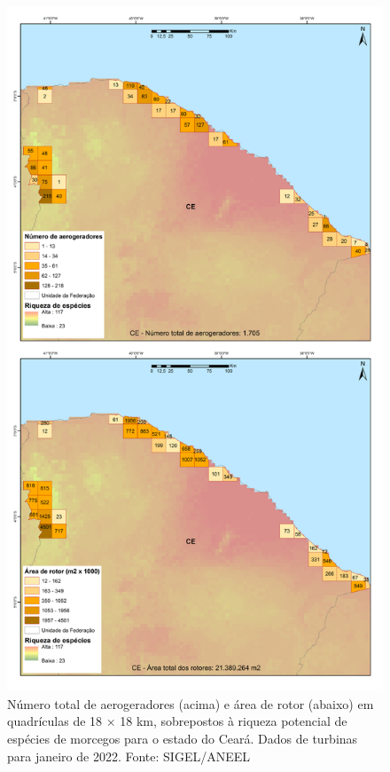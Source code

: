 \documentclass[
  oneside]{scrbook}
\begin{document}
\begin{figure}[H]

{\centering \includegraphics[width=0.7\linewidth]{imagens/cap09/Figura_9.7} 

}

\caption{Número total de aerogeradores (acima) e área de rotor (abaixo) em quadrículas de 18 × 18 km, sobrepostos à riqueza potencial de espécies de morcegos para o estado do Ceará. Dados de turbinas para janeiro de 2022. Fonte: SIGEL/ANEEL}\label{fig:72}
\end{figure}
\end{document}
